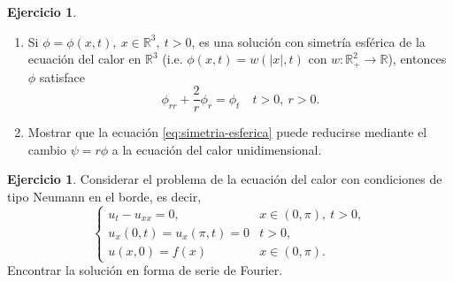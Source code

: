 \documentclass[12pt, a4paper]{amsbook}
\newcommand{\R}{{\mathbb R}}
\theoremstyle{remark}
\theoremstyle{definition}
\newtheorem{ejer}[teo]{Ejercicio}
\numberwithin{section}{chapter}
\numberwithin{subsection}{section}
\numberwithin{equation}{section}
\numberwithin{figure}{chapter}
\begin{document}
\begin{ejer}\label{ejer:simetria-esferica}
\begin{enumerate}
\item Si $\phi=\phi(x,t),\ x\in \R^3,\ t>0$, es una solución con
simetría esférica de la ecuación del calor en $\R^3$ (i.e.
$\phi(x,t) = w(|x|,t)$ con $w:\R^2_+\to\R$), entonces $\phi$
satisface
\begin{equation}
\label{eq:simetria-esferica}
\phi_{rr} + \frac{2}{r}\phi_r = \phi_t \quad t>0,\ r>0.
\end{equation}
\item Mostrar que la ecuación \eqref{eq:simetria-esferica} puede reducirse mediante el cambio
$\psi = r\phi$ a la ecuación del calor unidimensional.
\end{enumerate}
\end{ejer}

\begin{ejer}
Considerar el problema de la ecuación del calor con condiciones de tipo Neumann en el borde, es decir,
$$
\begin{cases}
u_t - u_{xx} = 0, & x\in (0,\pi),\ t>0,\\
u_x(0,t)=u_x(\pi, t)=0 & t>0,\\
u(x,0)=f(x) & x\in (0,\pi).
\end{cases}
$$
Encontrar la solución en forma de serie de Fourier.
\end{ejer}

\end{document}

